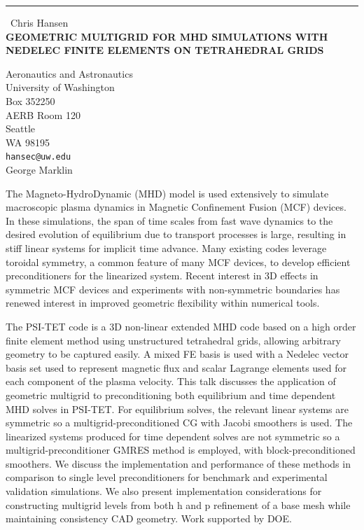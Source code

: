 \documentclass{report}
\begin{document}
\begin{center}
\rule{6in}{1pt} \
{\large Chris Hansen \\
{\bf GEOMETRIC MULTIGRID FOR MHD SIMULATIONS WITH NEDELEC FINITE ELEMENTS ON TETRAHEDRAL GRIDS}}

Aeronautics and Astronautics \\ University of Washington \\ Box 352250 \\ AERB Room 120 \\ Seattle \\ WA 98195
\\
{\tt hansec@uw.edu}\\
George Marklin\end{center}

The Magneto-HydroDynamic (MHD) model is used extensively to simulate
macroscopic plasma dynamics in Magnetic Confinement Fusion (MCF) devices.
In these simulations, the span of time scales from fast wave dynamics to
the desired evolution of equilibrium due to transport processes is large,
resulting in stiff linear systems for implicit time advance. Many
existing codes leverage toroidal symmetry, a common feature of many MCF
devices, to develop efficient preconditioners for the linearized system.
Recent interest in 3D effects in symmetric MCF devices and experiments
with non-symmetric boundaries has renewed interest in improved geometric
flexibility within numerical tools.

The PSI-TET code is a 3D non-linear extended MHD code based on a high
order finite element method using unstructured tetrahedral grids,
allowing arbitrary geometry to be captured easily. A mixed FE basis is
used with a Nedelec vector basis set used to represent magnetic flux and
scalar Lagrange elements used for each component of the plasma velocity.
This talk discusses the application of geometric multigrid to
preconditioning both equilibrium and time dependent MHD solves in
PSI-TET. For equilibrium solves, the relevant linear systems are
symmetric so a multigrid-preconditioned CG with Jacobi smoothers is used.
The linearized systems produced for time dependent solves are not
symmetric so a multigrid-preconditioner GMRES method is employed, with
block-preconditioned smoothers. We discuss the implementation and
performance of these methods in comparison to single level
preconditioners for benchmark and experimental validation simulations. We
also present implementation considerations for constructing multigrid
levels from both h and p refinement of a base mesh while maintaining
consistency CAD geometry. Work supported by DOE.
\end{document}
